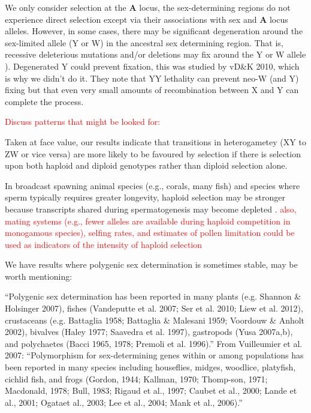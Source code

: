 \documentclass[12pt]{article}
\begin{document}
We only consider selection at the \textbf{A} locus, the sex-determining regions do not experience direct selection except via their associations with sex and \textbf{A} locus alleles. 
However, in some cases, there may be significant degeneration around the sex-limited allele (Y or W) in the ancestral sex determining region. That is, recessive deleterious mutations and/or deletions may fix around the Y or W allele \citealt{Rice:1996ke,Charlesworth:2000cc,Bachtrog:2006ed,Marais:2008hm}). 
Degenerated Y could prevent fixation, this was studied by vD\&K 2010, which is why we didn't do it. 
They note that YY lethality can prevent neo-W (and Y) fixing but that even very small amounts of recombination between X and Y can complete the process. 


\textcolor{red}{\noindent Discuss patterns that might be looked for:}

Taken at face value, our results indicate that transitions in heterogametey (XY to ZW or vice versa) are more likely to be favoured by selection if there is selection upon both haploid and diploid genotypes rather than diploid selection alone. 

In broadcast spawning animal species (e.g., corals, many fish) and species where sperm typically requires greater longevity, haploid selection may be stronger because transcripts shared during spermatogenesis may become depleted \citep{Immler:2014im}. 
\textcolor{red}{also, mating systems (e.g., fewer alleles are available during haploid competition in monogamous species), selfing rates, and estimates of pollen limitation could be used as indicators of the intensity of haploid selection}

\noindent
We have results where polygenic sex determination is sometimes stable, may be worth mentioning:

``Polygenic sex determination has been reported in many plants (e.g. Shannon \& Holsinger 2007), fishes (Vandeputte et al. 2007; Ser et al. 2010; Liew et al. 2012), crustaceans (e.g. Battaglia 1958; Battaglia \& Malesani 1959; Voordouw
\& Anholt 2002), bivalves (Haley 1977; Saavedra et al. 1997), gastropods (Yusa 2007a,b), and polychaetes (Bacci 1965, 1978; Premoli et al. 1996).''
From Vuilleumier et al. 2007:
``Polymorphism for sex-determining genes within or among populations has been reported in many species including houseflies, midges, woodlice, platyfish, cichlid fish, and frogs (Gordon, 1944; Kallman, 1970; Thomp-son, 1971; Macdonald, 1978; Bull, 1983; Rigaud et al., 1997; Caubet et al., 2000; Lande et al., 2001; Ogataet al., 2003; Lee et al., 2004; Mank et al., 2006).''
\end{document}
